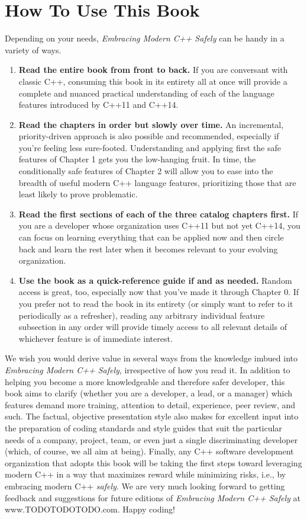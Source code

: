 \section{How To Use This Book}

Depending on your needs, \textit{Embracing Modern C++ Safely} can be handy in a variety of ways.
\begin{enumerate}
\item{\textbf{Read the entire book from front to back.} If you are conversant with classic C++, consuming this book in its entirety all at once will provide a complete and nuanced practical understanding of each of the language features introduced by C++11 and C++14.}
\item{\textbf{Read the chapters in order but slowly over time.} An incremental, priority-driven approach is also possible and recommended, especially if you're feeling less sure-footed. Understanding and applying first the safe features of Chapter 1 gets you the low-hanging fruit. In time, the conditionally safe features of Chapter 2 will allow you to ease into the breadth of useful modern C++ language features, prioritizing those that are least likely to prove problematic.}
\item{\textbf{Read the first sections of each of the three catalog chapters first.} If you are a developer whose organization uses C++11 but not yet C++14, you can focus on learning everything that can be applied now and then circle back and learn the rest later when it becomes relevant to your evolving organization.}
\item{\textbf{Use the book as a quick-reference guide if and as needed.} Random access is great, too, especially now that you've made it through Chapter 0. If you prefer not to read the book in its entirety (or simply want to refer to it periodically as a refresher), reading any arbitrary individual feature subsection in any order will provide timely access to all relevant details of whichever feature is of immediate interest.}
\end{enumerate}

We wish you would derive value in several ways from the knowledge imbued into \textit{Embracing Modern C++ Safely}, irrespective of how you read it. In addition to helping you become a more knowledgeable and therefore safer developer, this book aims to clarify (whether you are a developer, a lead, or a manager) which features demand more training, attention to detail, experience, peer review, and such. The factual, objective presentation style also makes for excellent input into the preparation of coding standards and style guides that suit the particular needs of a company, project, team, or even just a single discriminating developer (which, of course, we all aim at being). Finally, any C++ software development organization that adopts this book will be taking the first steps toward leveraging modern C++ in a way that maximizes reward while minimizing risks, i.e., by embracing modern C++ \textit{safely}. We are very much looking forward to getting feedback and suggestions for future editions of \textit{Embracing Modern C++ Safely} at www.TODOTODOTODO.com. Happy coding!

